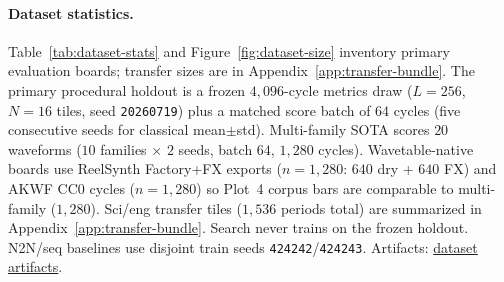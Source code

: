 \paragraph{Dataset statistics.}
Table~\ref{tab:dataset-stats} and Figure~\ref{fig:dataset-size} inventory primary evaluation boards; transfer sizes are in Appendix~\ref{app:transfer-bundle}.
The primary procedural holdout is a frozen $4{,}096$-cycle metrics draw ($L{=}256$, $N{=}16$ tiles, seed \texttt{20260719}) plus a matched score batch of $64$ cycles (five consecutive seeds for classical mean$\pm$std).
Multi-family SOTA scores $20$ waveforms ($10$ families $\times$ $2$ seeds, batch $64$, $1{,}280$ cycles).
Wavetable-native boards use ReelSynth Factory+FX exports ($n{=}1{,}280$: $640$ dry + $640$ FX) and AKWF CC0 cycles ($n{=}1{,}280$) so Plot~4 corpus bars are comparable to multi-family ($1{,}280$).
Sci/eng transfer tiles ($1{,}536$ periods total) are summarized in Appendix~\ref{app:transfer-bundle}.
Search never trains on the frozen holdout. N2N/seq baselines use disjoint train seeds \texttt{424242}/\texttt{424243}.
Artifacts: \href{https://github.com/reeldemo/denoise-opt-meta/tree/master/paper/Unsupervised_Wrap-Discontinuity_Repair_in_Wavetable_Synthesis_via_Hybrid_GA-PPO_Meta-Search_v14/figures}{dataset artifacts}.

